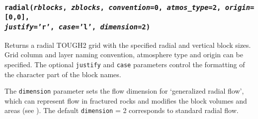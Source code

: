 \begin{snugshade}
\subsubsection{\texttt{radial(\emph{rblocks}, \emph{zblocks}, \emph{convention}=0, \emph{atmos\_type}=2, \emph{origin}=[0,0],\\
    \emph{justify}='r', \emph{case}='l', \emph{dimension}=2)}}
\end{snugshade}
\label{sec:t2grid:radial}

Returns a radial TOUGH2 grid with the specified radial and vertical block sizes.  Grid column and layer naming convention, atmosphere type and origin can be specified.  The optional \texttt{justify} and \texttt{case} parameters control the formatting of the character part of the block names.

The \texttt{dimension} parameter sets the flow dimension for `generalized radial flow', which can represent flow in fractured rocks and modifies the block volumes and areas (see \cite{barker_1988}).  The default \texttt{dimension} = 2 corresponds to standard radial flow.

